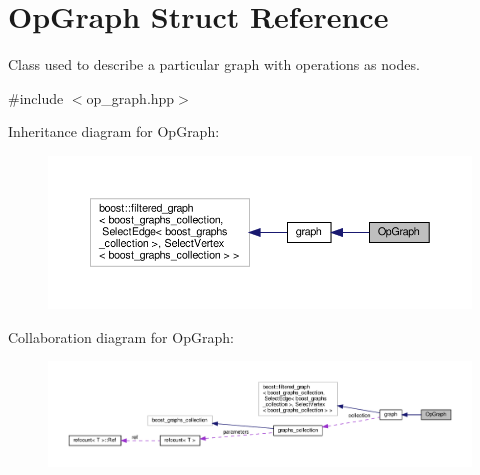 \hypertarget{structOpGraph}{}\section{Op\+Graph Struct Reference}
\label{structOpGraph}


Class used to describe a particular graph with operations as nodes.  




{\ttfamily \#include $<$op\+\_\+graph.\+hpp$>$}



Inheritance diagram for Op\+Graph\+:
\nopagebreak
\begin{figure}[H]
\begin{center}
\leavevmode
\includegraphics[width=350pt]{d1/d4c/structOpGraph__inherit__graph}
\end{center}
\end{figure}


Collaboration diagram for Op\+Graph\+:
\nopagebreak
\begin{figure}[H]
\begin{center}
\leavevmode
\includegraphics[width=350pt]{df/d14/structOpGraph__coll__graph}
\end{center}
\end{figure}

